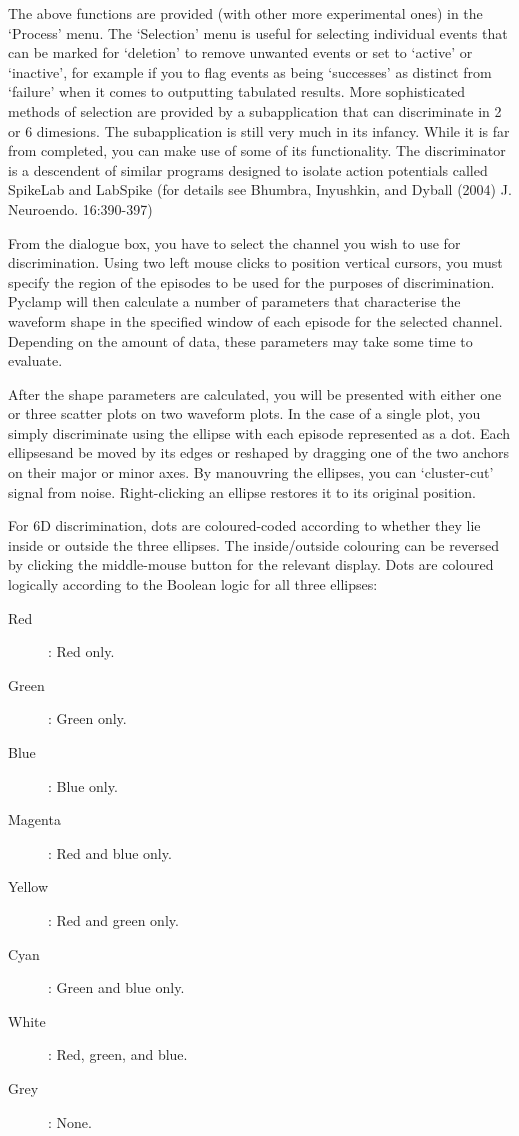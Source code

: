 \documentclass{article}
\begin{document}
The above functions are provided (with other more experimental ones) in the `Process' menu. The `Selection' menu is
useful for selecting individual events that can be marked for `deletion' to remove unwanted events or set to `active' or
`inactive', for example if you to flag events as being `successes' as distinct from `failure' when it comes to
outputting tabulated results.  More sophisticated methods of selection are provided by a subapplication that can
discriminate in 2 or 6 dimesions. The subapplication is still very much in its infancy. While it is far from completed,
you can make use of some of its functionality. The discriminator is a descendent of similar programs designed to isolate
action potentials called SpikeLab and LabSpike (for details see Bhumbra, Inyushkin, and Dyball (2004) J.  Neuroendo.
16:390-397)

From the dialogue box, you have to select the channel you wish to use for discrimination. Using two left mouse clicks to
position vertical cursors, you must specify the region of the episodes to be used for the purposes of discrimination.
Pyclamp will then calculate a number of parameters that characterise the waveform shape in the specified window of each
episode for the selected channel. Depending on the amount of data, these parameters may take some time to evaluate.

After the shape parameters are calculated, you will be presented with either one or three scatter plots on two waveform
plots. In the case of a single plot, you simply discriminate using the ellipse with each episode represented as a dot.
Each ellipsesand be moved by its edges or reshaped by dragging one of the two anchors on their major or minor axes. By
manouvring the ellipses, you can `cluster-cut' signal from noise. Right-clicking an ellipse restores it to its original
position.

For 6D discrimination, dots are coloured-coded according to whether they lie inside or outside the three ellipses. The
inside/outside colouring can be reversed by clicking the middle-mouse button for the relevant display. Dots are coloured
logically according to the Boolean logic for all three ellipses:

\begin{description}
  \item[Red]: Red only.
  \item[Green]: Green only.
  \item[Blue]: Blue only.
  \item[Magenta]: Red and blue only.
  \item[Yellow]: Red and green only.
  \item[Cyan]: Green and blue only.
  \item[White]: Red, green, and blue.
  \item[Grey]: None.
\end{description}
\end{document}
